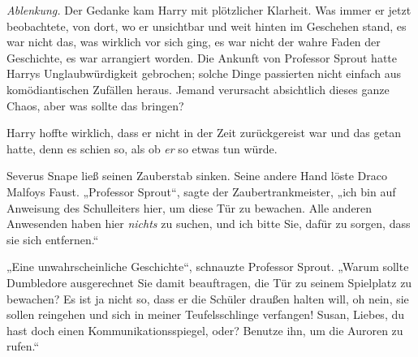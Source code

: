 \emph{Ablenkung.}
Der Gedanke kam Harry mit plötzlicher Klarheit. Was immer er jetzt beobachtete, von dort, wo er unsichtbar und weit hinten im Geschehen stand, es war nicht das, was wirklich vor sich ging, es war nicht der wahre Faden der Geschichte, es war arrangiert worden. Die Ankunft von Professor Sprout hatte Harrys Unglaubwürdigkeit gebrochen; solche Dinge passierten nicht einfach aus komödiantischen Zufällen heraus.
Jemand verursacht absichtlich dieses ganze Chaos, aber was sollte das bringen?

Harry hoffte wirklich, dass er nicht in der Zeit zurückgereist war und das getan hatte, denn es schien so, als ob \emph{er} so etwas tun würde.

Severus Snape ließ seinen Zauberstab sinken. Seine andere Hand löste Draco Malfoys Faust. „Professor Sprout“, sagte der Zaubertrankmeister, „ich bin auf Anweisung des Schulleiters hier, um diese Tür zu bewachen. Alle anderen Anwesenden haben hier \emph{nichts} zu suchen, und ich bitte Sie, dafür zu sorgen, dass sie sich entfernen.“

„Eine unwahrscheinliche Geschichte“, schnauzte Professor Sprout. „Warum sollte Dumbledore ausgerechnet Sie damit beauftragen, die Tür zu seinem Spielplatz zu bewachen? Es ist ja nicht so, dass er die Schüler draußen halten will, oh nein, sie sollen reingehen und sich in meiner Teufelsschlinge verfangen! Susan, Liebes, du hast doch einen Kommunikationsspiegel, oder? Benutze ihn, um die Auroren zu rufen.“

